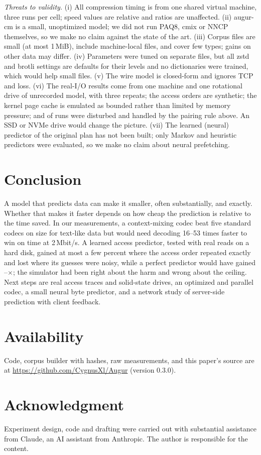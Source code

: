 \documentclass[conference]{IEEEtran}
\newcommand{\cm}{\textsf{augur-cm}}
\begin{document}
\emph{Threats to validity.} (i) All compression timing is from one shared virtual machine, three runs per cell; speed values are relative and ratios are unaffected. (ii) \cm{} is a small, unoptimized model; we did not run PAQ8, cmix or NNCP themselves, so we make no claim against the state of the art. (iii) Corpus files are small (at most 1\,MiB), include machine-local files, and cover few types; gains on other data may differ. (iv) Parameters were tuned on separate files, but all zstd and brotli settings are defaults for their levels and no dictionaries were trained, which would help small files. (v) The wire model is closed-form and ignores TCP and loss. (vi) The real-I/O results come from one machine and one rotational drive of unrecorded model, with three repeats; the access orders are synthetic; the kernel page cache is emulated as bounded rather than limited by memory pressure; and \realDisturbed{} of \realRuns{} runs were disturbed and handled by the pairing rule above. An SSD or NVMe drive would change the picture. (vii) The learned (neural) predictor of the original plan has not been built; only Markov and heuristic predictors were evaluated, so we make no claim about neural prefetching.

\section{Conclusion}
A model that predicts data can make it smaller, often substantially, and exactly. Whether that makes it faster depends on how cheap the prediction is relative to the time saved. In our measurements, a context-mixing codec beat five standard codecs on size for text-like data but would need decoding 16--53 times faster to win on time at 2\,Mbit/s. A learned access predictor, tested with real reads on a hard disk, gained at most a few percent where the access order repeated exactly and lost where its guesses were noisy, while a perfect predictor would have gained \realOracleLo--\realOracleHi$\times$; the simulator had been right about the harm and wrong about the ceiling. Next steps are real access traces and solid-state drives, an optimized and parallel codec, a small neural byte predictor, and a network study of server-side prediction with client feedback.

\section*{Availability}
Code, corpus builder with hashes, raw measurements, and this paper's source are at \url{https://github.com/CygnusXl/Augur} (version 0.3.0).

\section*{Acknowledgment}
Experiment design, code and drafting were carried out with substantial assistance from Claude, an AI assistant from Anthropic. The author is responsible for the content.




\end{document}

